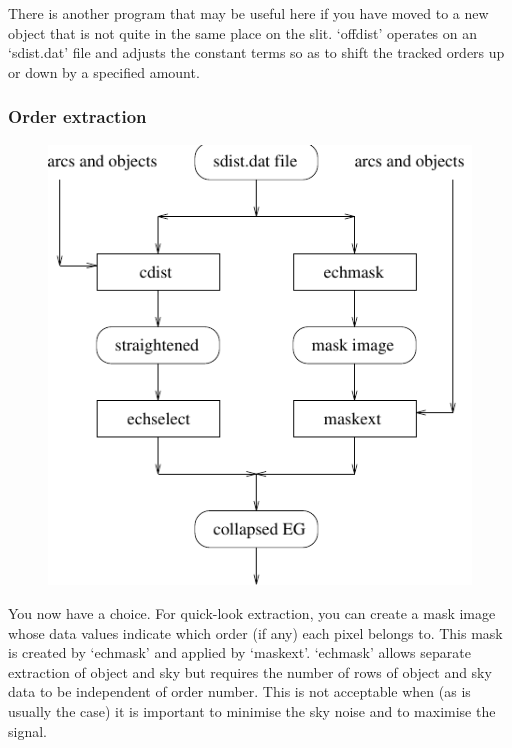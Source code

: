 \documentclass[11pt,twoside]{article}
\newcommand{\htmladdimg}[1]{}
\newenvironment{latexonly}{}{}
\begin{document}
   There is another program that may be useful here if you have moved
   to a new object that is not quite in the same place on the slit.
   `offdist' operates on an `sdist.dat' file and adjusts the constant
   terms so as to shift the tracked orders up or down by a specified
   amount.


\subsubsection{\label{techno13extract}Order extraction}

\begin{latexonly}
\begin{figure}[htb]
\begin{center}
\includegraphics{sun86_ech3}
\end{center}
\end{figure}
\end{latexonly}
\htmladdimg{echelle3.png}

   You now have a choice. For quick-look extraction, you can create a
   mask image whose data values indicate which order (if any) each pixel
   belongs to. This mask is created by `echmask' and applied by
   `maskext'. `echmask' allows separate extraction of object and sky but
   requires the number of rows of object and sky data to be independent
   of order number. This is not acceptable when (as is usually the case)
   it is important to minimise the sky noise and to maximise the signal.
\end{document}
